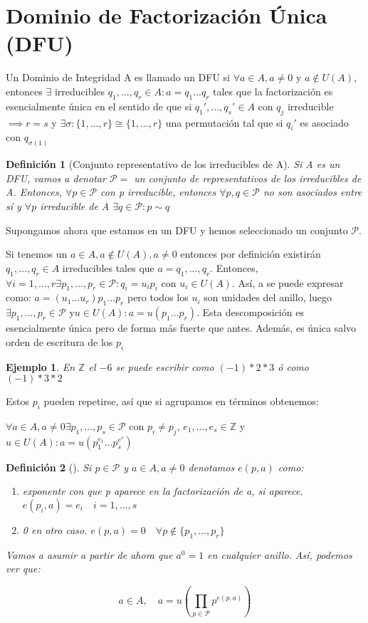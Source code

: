 \documentclass[11pt, a4paper, titlepage]{article}
\providecommand{\ent}{\mathbb{Z}}
\theoremstyle{theorem-style}
\theoremstyle{definition-style}
\newtheorem*{ndef}{Definición}
\theoremstyle{remark-style}
\theoremstyle{example-style}
\newtheorem*{ejemplo}{Ejemplo}
\newenvironment{nlist}
{\begin{enumerate}
\renewcommand\labelenumi{(\emph{\roman{enumi})}}}
{\end{enumerate}}
\begin{document}
\section{Dominio de Factorización Única (DFU)}

Un Dominio de Integridad A es llamado un DFU si $\forall a \in A, a\ne 0$ y $a\notin U(A)$, entonces $\exists$ irreducibles $q_1 ,...,q_r \in A : a = q_1 ...q_r$ tales que la factorización es esencialmente única en el sentido de que si $q_1' ,...,q_s' \in A $ con $q_j$ irreducible $\implies r = s$ y $\exists \sigma:\{1,...,r\} \cong \{1,...,r\}$ una permutación tal que si $q_i'$ es asociado con $q_{\sigma(1)}$

\begin{ndef}[Conjunto representativo de los irreducibles de A]
	Si A es un DFU, vamos a denotar $\mathcal{P}= $ un conjunto de representativos de los irreducibles de A. Entonces, $\forall p \in \mathcal{P}$ con p irreducible, entonces $\forall p, q \in \mathcal{P}$ no son asociados entre sí y $\forall p $ irreducible de A $ \exists q \in \mathcal{P} : p \sim q$   

\end{ndef}

Supongamos ahora que estamos en un DFU y hemos seleccionado un conjunto $\mathcal{P}$.

Si tenemos un $a\in A, a \notin U(A), a \ne 0$ entonces por definición existirán $q_1 ,...,q_r \in A $ irreducibles tales que $a = q_1 ,...,q_r $. Entonces, $\forall i = 1,...,r \exists p_1,...,p_r \in \mathcal{P} : q_i = u_ip_i $ con $u_i \in U(A)$. Así, a se puede expresar como: $a = (u_1...u_r)p_1...p_r$ pero todos los $u_i$ son unidades del anillo, luego $\exists p_1,...,p_r \in \mathcal{P} $ y$ u \in U(A) : a = u(p_1...p_r)$. Esta descomposición es esencialmente única pero de forma más fuerte que antes. Además, es única salvo orden de escritura de los $p_i$

\begin{ejemplo}
	En $\ent$ el $-6$ se puede escribir como $(-1)*2*3$ ó como $(-1)*3*2$
\end{ejemplo}

Estos $p_i$ pueden repetirse, así que si agrupamos en términos obtenemos:

$\forall a \in A, a \ne 0 \exists p_1,...,p_s \in \mathcal{P}$ con $p_i \ne p_j$, $e_1,...,e_s \in \ent$ y $ u \in U(A) : a = u(p_1^{e_1}...p_s^{e^s})$


\begin{ndef}[]
	Si $p\in \mathcal{P}$ y $a \in A, a \ne 0$ denotamos $e(p,a)$ como:
	\begin{nlist}
	\item exponente con que p aparece en la factorización de a, si aparece. $e(p_i,a) = e_i \quad i = 1,...,s$
	\item 0 en otro caso. $e(p,a) = 0 \quad \forall p \notin \{p_1,...,p_r\}$

\end{nlist}
	
	Vamos a asumir a partir de ahora que $a^0  = 1 $ en cualquier anillo. Así, podemos ver que:
	
	$$ a \in A, \quad a = u(\prod _{p \in \mathcal{P}}p^{e(p,a)})$$
\end{ndef}
\end{document}
